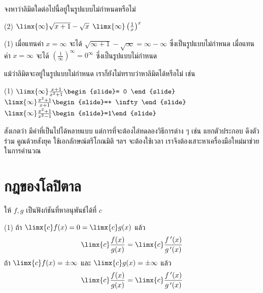 \begin{frame}[t]
\begin{ex}
จงหาว่าลิมิตใดต่อไปนี้อยู่ในรูปแบบไม่กำหนดหรือไม่
\begin{tasks}[style=enumerate](2)
\task $\limx{\infty} \sqrt{x+1} - \sqrt{x}$
\task $\limx{\infty} \left(\frac{1}{x}\right)^x$
\end{tasks}
\end{ex}
\end{frame}

\begin{frame}
\begin{sol}
\begin{tasks}[style=enumerate](1)
\task เมื่อแทนค่า $x= \infty$ จะได้ $\sqrt{\infty + 1} - \sqrt{\infty} = \infty - \infty$ ซึ่งเป็นรูปแบบไม่กำหนด
\task เมื่อแทนค่า $x=\infty$ จะได้ $\left(\frac{1}{\infty}\right)^{\infty} = 0^{\infty}$ ซึ่งเป็นรูปแบบไม่กำหนด
\end{tasks}
\end{sol}
\end{frame}


\begin{frame}
แม้ว่าลิมิตจะอยู่ในรูปแบบไม่กำหนด เราก็ยังไม่ทราบว่าหาลิมิตได้หรือไม่ เช่น
\begin{tasks}[style=enumerate](1)
\task $\limx{\infty} \frac{x+1}{x^2+1} \begin{slide}= 0 \end{slide}$
\task $\limx{\infty} \frac{x^2+1}{x+1} \begin{slide}=+ \infty \end{slide}$
\task $\limx{\infty} \frac{x^2+1}{x^2-1} \begin{slide}=1\end{slide}$
\end{tasks}
สังเกตว่า มีค่าที่เป็นไปได้หลายแบบ แต่การที่จะต้องไล่ทดลองวิธีการต่าง ๆ เช่น แยกตัวประกอบ ดึงตัวร่วม คูณด้วยสังยุค ใช้เอกลักษณ์ตรีโกณมิติ ฯลฯ จะต้องใช้เวลา เราจึงต้องเสาะหาเครื่องมือใหม่มาช่วยในการคำนวณ
\end{frame}

\section{กฎของโลปิตาล}
\frame{\sectionpage}

\begin{frame}
\begin{thm}{}{}
ให้ $f,g$ เป็นฟังก์ชันที่หาอนุพันธ์ได้ที่ $c$
\begin{tasks}[style=enumerate](1)
\task ถ้า $\limx{c} f(x) = 0 = \limx{c} g(x)$ \pa แล้ว
\begin{equation} \label{eq:lhopital1}
 \limx{c} \frac{f(x)}{g(x)} = \limx{c} \frac{f\,'(x)}{g\,'(x)}
 \end{equation}
\task ถ้า $\limx{c} f(x) = \pm\infty$ และ $\limx{c} g(x) = \pm \infty$ \pa แล้ว
\begin{equation} \label{eq:lhopital2}
\limx{c} \frac{f(x)}{g(x)} = \limx{c} \frac{f\,'(x)}{g\,'(x)}
\end{equation}
\end{tasks}
\end{thm}
\end{frame}


